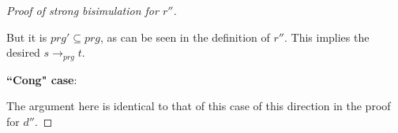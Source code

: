 \begin{proof}[Proof of strong bisimulation for $r''$]
\begin{enumerate}
But it is $prg' \subseteq prg$, as can be seen in the definition of $r''$. This implies the desired $s \longrightarrow_{prg} t$.
\end{enumerate}

\item \textbf{``Cong" case}:

The argument here is identical to that of this case of this direction in the proof for $d''$.

\end{proof}
